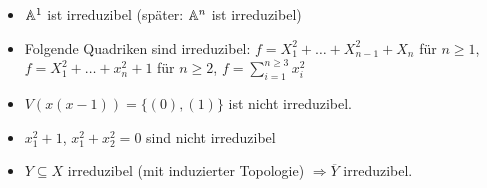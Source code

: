 \begin{bsp}
	\begin{itemize}
		\item $\mathbb{A}^1$ ist irreduzibel (später: $\mathbb{A}^n$ ist irreduzibel)
		\item Folgende Quadriken sind irreduzibel: $f = X_1^2 + \dots + X_{n-1}^2 + X_n$ für $n \geq 1$, $f = X_1^2+ \dots + x_n^2 + 1$ für $n \geq 2$, $f = \sum_{i=1}^{n \geq 3} x_i^2$
		\item $V(x(x-1)) = \{ (0),(1) \}$ ist nicht irreduzibel.
		\item $x_1^2 + 1$, $x_1^2+x_2^2 = 0$ sind nicht irreduzibel
		\item $Y \subseteq X$ irreduzibel (mit induzierter Topologie) $\Rightarrow \overline{Y}$ irreduzibel.
	\end{itemize}
\end{bsp}


